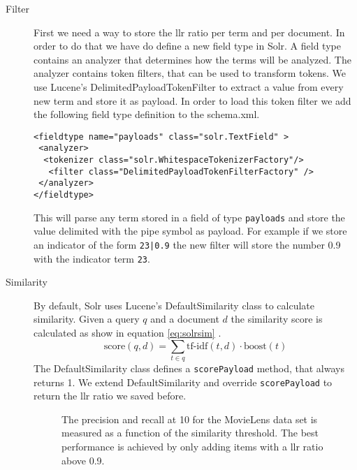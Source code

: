 \begin{description}
\item[Filter] First we need a way to store the \gls{llr} ratio per term and per document. In order to do that we have do define a new field type in Solr. A field type contains an analyzer that determines how the terms will be analyzed. The analyzer contains token filters, that can be used to transform tokens. We use Lucene's DelimitedPayloadTokenFilter to extract a value from every new term and store it as payload. In order to load this token filter we add the following field type definition to the schema.xml.
\begin{lstlisting}[caption={Fieldtype definition for field with payload.}]
<fieldtype name="payloads" class="solr.TextField" >
 <analyzer>
  <tokenizer class="solr.WhitespaceTokenizerFactory"/>
   <filter class="DelimitedPayloadTokenFilterFactory" />
 </analyzer>
</fieldtype>
\end{lstlisting}
This will parse any term stored in a field of type \verb|payloads| and store the value delimited with the pipe symbol as payload. For example if we store an indicator of the form \verb-23|0.9- the new filter will store the number 0.9 with the indicator term \verb|23|.
\item[Similarity] By default, Solr uses Lucene's DefaultSimilarity class to calculate similarity. Given a query $q$ and a document $d$ the similarity score is calculated as show in equation \ref{eq:solrsim} \cite{grainger}.
\begin{equation}
\label{eq:solrsim}
\text{score}(q,d) = \sum_{t \in q} \text{tf-idf}(t,d) \cdot \text{boost}(t) 
\end{equation}
The DefaultSimilarity class defines a \verb|scorePayload| method, that always returns 1. We extend DefaultSimilarity and override \verb|scorePayload| to return the \gls{llr} ratio we saved before.

\begin{figure}
  \centering
{}
\caption{The precision and recall at 10 for the MovieLens data set is measured as a function of the similarity threshold. The best performance is achieved by only adding items with a \gls{llr} ratio above 0.9.}
\label{fig:threshold}
\end{figure}


\end{description}
